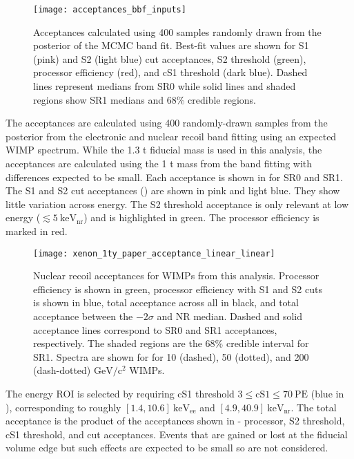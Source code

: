 \begin{figure}
\centering
\texttt{[image: acceptances\_bbf\_inputs]}
\caption{Acceptances calculated using 400 samples randomly drawn from the posterior of the MCMC band fit.  Best-fit values are shown for
S1 (pink) and S2 (light blue) cut acceptances, S2 threshold (green), processor efficiency (red), and cS1 threshold
(dark blue).  Dashed lines represent medians from SR0 while solid lines and shaded regions show SR1 medians and 68\% credible regions.}
\label{fig:dark_matter_results_selection_acc_components}
\end{figure}

The acceptances are calculated using 400 randomly-drawn samples from the posterior from the electronic and nuclear recoil band
fitting using an expected WIMP spectrum.  While the 1.3 t fiducial mass is used in this analysis, the
acceptances are calculated using the 1 t mass from the band fitting with differences expected to be small.  Each acceptance is shown in
 for SR0 and SR1.  The S1 and S2 cut
acceptances () are shown in pink and light blue.  They show little variation
across energy.  The S2 threshold acceptance
is only relevant at low energy ($\lesssim 5\ \mathrm{keV_{nr}}$) and is highlighted in green.  The processor efficiency is marked in
red.

\begin{figure}
\centering
\texttt{[image: xenon\_1ty\_paper\_acceptance\_linear\_linear]}
\caption{Nuclear recoil acceptances for WIMPs from this analysis.  Processor efficiency is shown in green, processor efficiency with S1
and S2 cuts is shown in blue, total acceptance across all \cstwob in black, and total acceptance between the $-2\sigma$ and NR
median.  Dashed and solid acceptance lines correspond to SR0 and SR1 acceptances,
respectively.  The shaded regions are the 68\% credible interval for SR1.  Spectra are shown for for 10 (dashed), 50 (dotted), and
200 (dash-dotted) $\mathrm{GeV/c^2}$ WIMPs.}
\label{fig:dark_matter_results_acceptances_band_fitting}
\end{figure}

The energy ROI is selected by requiring cS1 threshold $3 \leq \mathrm{cS1} \leq 70\ \mathrm{PE}$ (blue in
), corresponding to roughly
$[1.4, 10.6]\ \mathrm{keV_{ee}}$ and $[4.9, 40.9]\ \mathrm{keV_{nr}}$.  The total acceptance is the product of the acceptances shown
in  - processor, S2 threshold, cS1 threshold, and
cut acceptances.  Events that are gained or lost at the fiducial volume edge but such effects are
expected to be small so are not considered.

